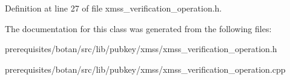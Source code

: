 Definition at line 27 of file xmss\+\_\+verification\+\_\+operation.\+h.



The documentation for this class was generated from the following files\+:\begin{DoxyCompactItemize}
\item 
prerequisites/botan/src/lib/pubkey/xmss/xmss\+\_\+verification\+\_\+operation.\+h\item 
prerequisites/botan/src/lib/pubkey/xmss/xmss\+\_\+verification\+\_\+operation.\+cpp\end{DoxyCompactItemize}
